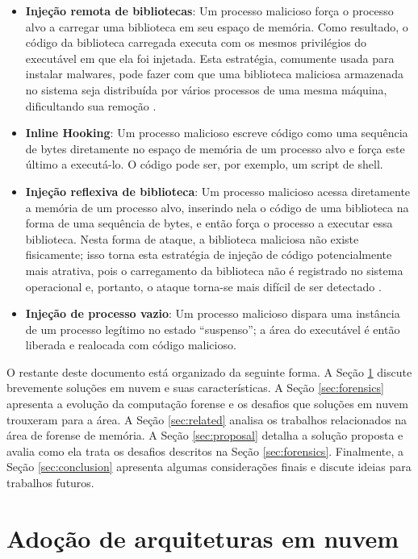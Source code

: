 \documentclass[conference]{IEEEtran}
\begin{document}
\begin{itemize}
 \item \textbf{Injeção remota de bibliotecas}: Um processo malicioso força o processo alvo a carregar uma biblioteca em seu espaço de memória.
 Como resultado, o código da biblioteca carregada executa com os mesmos privilégios do executável em que ela foi injetada. 
 Esta estratégia, comumente usada para instalar malwares, pode fazer com que uma biblioteca maliciosa armazenada no sistema seja distribuída por vários processos de uma mesma máquina, dificultando sua remoção \cite{Miller2004}.
 \item \textbf{Inline Hooking}: Um processo malicioso escreve código como uma sequência de bytes diretamente no espaço de memória de um processo alvo e força este último a executá-lo. 
 O código pode ser, por exemplo, um script de shell.
 \item \textbf{Injeção reflexiva de biblioteca}: Um processo malicioso acessa diretamente a memória de um processo alvo, inserindo nela o código de uma biblioteca na forma de uma sequência de bytes, e então força o processo a executar essa biblioteca. 
 Nesta forma de ataque, a biblioteca maliciosa não existe fisicamente; isso torna esta estratégia de injeção de código potencialmente mais atrativa, pois o carregamento da biblioteca não é registrado no sistema operacional e, portanto, o ataque torna-se mais difícil de ser detectado \cite{Fewer2008}.
 \item \textbf{Injeção de processo vazio}: Um processo malicioso dispara uma instância de um processo legítimo no estado ``suspenso''; a área do executável é então liberada e realocada com código malicioso.
\end{itemize}


O restante deste documento está organizado da seguinte forma.
%
A Seção \ref{sec:cloud} discute brevemente soluções em nuvem e suas características.
%
A Seção \ref{sec:forensics} apresenta a evolução da computação forense e os desafios que soluções em nuvem trouxeram para a área.
%
A Seção \ref{sec:related} analisa os trabalhos relacionados na área de forense de memória.
%
A Seção \ref{sec:proposal} detalha a solução proposta e avalia como ela trata os desafios descritos na Seção \ref{sec:forensics}.
%
Finalmente, a Seção \ref{sec:conclusion} apresenta algumas considerações finais e discute ideias para trabalhos futuros.


\section{Adoção de arquiteturas em nuvem}
\label{sec:cloud}
\end{document}
